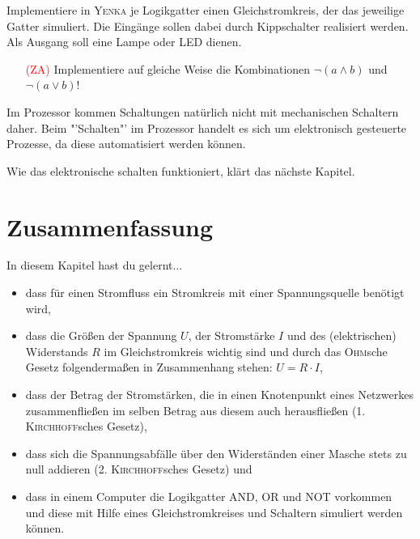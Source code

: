 \begin{Aufgabe}
Implementiere in \textsc{Yenka} je Logikgatter einen Gleichstromkreis, der das jeweilige Gatter simuliert. Die Eingänge sollen dabei durch Kippschalter realisiert werden. Als Ausgang soll eine Lampe oder LED dienen.
\begin{itemize}
\item[\textcolor{red}{(ZA)}] Implementiere auf gleiche Weise die Kombinationen $\neg (a \wedge b)$ und \\ $\neg (a \vee b)$!
\end{itemize}
\end{Aufgabe}

Im Prozessor kommen Schaltungen natürlich nicht mit mechanischen Schaltern daher.
Beim "'Schalten"' im Prozessor handelt es sich um elektronisch gesteuerte Prozesse, da diese automatisiert werden können.

Wie das elektronische schalten funktioniert, klärt das nächste Kapitel.


\section*{Zusammenfassung}

In diesem Kapitel hast du gelernt...

\begin{itemize}
\item dass für einen Stromfluss ein Stromkreis mit einer Spannungsquelle benötigt wird,
\item dass die Größen der Spannung $U$, der Stromstärke $I$ und des (elektrischen) Widerstands $R$ im Gleichstromkreis wichtig sind und durch das \textsc{Ohm}sche Gesetz folgendermaßen in Zusammenhang stehen: $U = R \cdot I$,
\item dass der Betrag der Stromstärken, die in einen Knotenpunkt eines Netzwerkes zusammenfließen im selben Betrag aus diesem auch herausfließen (1. \textsc{Kirchhoff}sches Gesetz),
\item dass sich die Spannungsabfälle über den Widerständen einer Masche stets zu null addieren (2. \textsc{Kirchhoff}sches Gesetz) und
\item dass in einem Computer die Logikgatter AND, OR und NOT vorkommen und diese mit Hilfe eines Gleichstromkreises und Schaltern simuliert werden können.
\end{itemize}